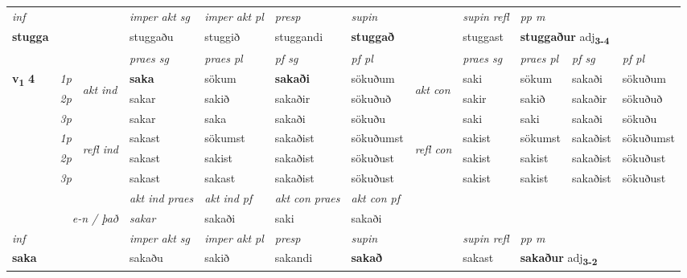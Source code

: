 \begin{longtable}[l]{X>{\footnotesize\itshape}llXXXXlXXXX}
\cmidrule{4-7}
   {\textit{inf}} & &  & \textit{imper akt sg} & \textit{imper akt pl}   & \textit{presp} & \textit{supin} && \textit{supin refl} & \textit{pp m} \\*
  {\textbf{stugga}} & && stuggaðu  & stuggið   & stuggandi &  \textbf{stuggað} && stuggast & \multicolumn{2}{l}{\textbf{stuggaður} adj\textbf{\textsubscript{3-4}}} \\*

\midrule

 & &   & \textit{praes sg}  & \textit{praes pl}    & \textit{ pf sg} & \textit{pf pl} & & \textit{praes sg}  & \textit{praes pl}    & \textit{pf sg} & \textit{pf pl }  \\ \cmidrule{4-7} \cmidrule{9-12}
 \multirow{2}{*}{{{\textbf{v{\textsubscript{1}}} \Large{\textbf{4}}}}}  & 1p & \multirow{3}{*}{\begin{turn}{90}\textit{akt ind}\end{turn}} & \textbf{saka} & sökum & \textbf{sakaði} & sökuðum & \multirow{3}{*}{\begin{turn}{90}\textit{akt con}\end{turn}} &saki & sökum & sakaði & sökuðum\\*
 & 2p &  &  sakar  & sakið & sakaðir & sökuðuð & & sakir & sakið & sakaðir & sökuðuð \\*
 & 3p &  & sakar & saka & sakaði & sökuðu & & saki & saki& sakaði & sökuðu \\*
\cmidrule{4-7} \cmidrule{9-12}
 & 1p & \multirow{3}{*}{\begin{turn}{90}\textit{refl ind}\end{turn}}  & sakast & sökumst & sakaðist & sökuðumst & \multirow{3}{*}{\begin{turn}{90}\textit{refl con}\end{turn}}  &sakist & sökumst & sakaðist & sökuðumst \\*
 & 2p &  & sakast & sakist & sakaðist & sökuðust & &sakist & sakist & sakaðist & sökuðust \\*
 & 3p  & & sakast & sakast & sakaðist & sökuðust & & sakist & sakist& sakaðist & sökuðust \\*
\cmidrule{4-7} \cmidrule{9-12}

   && &  \textit{akt ind praes} & \textit{akt ind pf} & \textit{akt con praes} & \textit{akt con pf} \\*
\multicolumn{3}{r}{\textit{e-n / það}} & sakar & sakaði & saki & sakaði \\*

\cmidrule{4-7}
   {\textit{inf}} & &  & \textit{imper akt sg} & \textit{imper akt pl}   & \textit{presp} & \textit{supin} && \textit{supin refl} & \textit{pp m} \\*
  {\textbf{saka}} & && sakaðu  & sakið   & sakandi &  \textbf{sakað} && sakast & \multicolumn{2}{l}{\textbf{sakaður} adj\textbf{\textsubscript{3-2}}} \\*


\end{longtable}
